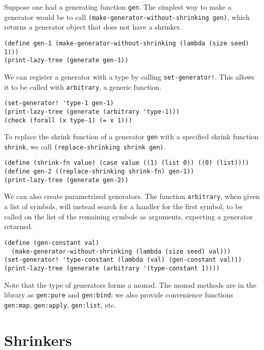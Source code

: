 \documentclass{scrartcl}
\begin{document}
Suppose one had a generating function \verb|gen|. The simplest way to make a
generator would be to call \verb|(make-generator-without-shrinking gen)|,
which returns a generator object that does not have a shrinker.

\begin{verbatim}
(define gen-1 (make-generator-without-shrinking (lambda (size seed) 1)))
(print-lazy-tree (generate gen-1))
\end{verbatim}

We can register a generator with a type by calling \verb|set-generator!|. This
allows it to be called with \verb|arbitrary|, a generic function.

\begin{verbatim}
(set-generator! 'type-1 gen-1)
(print-lazy-tree (generate (arbitrary 'type-1)))
(check (forall (x type-1) (= x 1)))
\end{verbatim}

To replace the shrink function of a generator \verb|gen| with a specified shrink
function \verb|shrink|, we call \verb|(replace-shrinking shrink gen)|.

\begin{verbatim}
(define (shrink-fn value) (case value ((1) (list 0)) ((0) (list))))
(define gen-2 ((replace-shrinking shrink-fn) gen-1))
(print-lazy-tree (generate gen-2))
\end{verbatim}

We can also create parametrized generators. The function \verb|arbitrary|, when
given a list of symbols, will instead search for a handler for the first symbol,
to be called on the list of the remaining symbols as arguments, expecting a
generator returned.

\begin{verbatim}
(define (gen-constant val)
  (make-generator-without-shrinking (lambda (size seed) val)))
(set-generator! 'type-constant (lambda (val) (gen-constant val)))
(print-lazy-tree (generate (arbitrary '(type-constant 1))))
\end{verbatim}

Note that the type of generators forms a monad. The monad methods are in the
library as \verb|gen:pure| and \verb|gen:bind|; we also provide convenience
functions \verb|gen:map|, \verb|gen:apply|, \verb|gen:list|, etc.

\section{Shrinkers}
\end{document}
